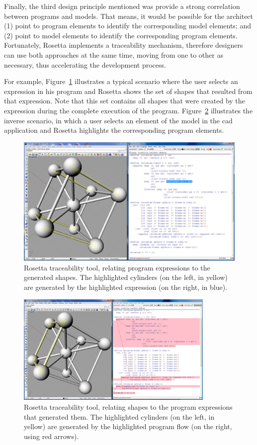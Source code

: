 Finally, the third design principle mentioned was provide a strong correlation between programs and models. That means, it would be possible for the architect (1) point to program elements to identify the corresponding model elements; and (2) point to model elements to identify the corresponding program elements. Fortunately, Rosetta implements a traceability mechanism, therefore designers can use both approaches at the same time, moving from one to other as necessary, thus accelerating the development process.

For example, Figure~\ref{fig:program-shape} illustrates a typical scenario where the user selects an expression in his program and
Rosetta shows the set of shapes that resulted from that expression. Note that this set contains all shapes that were created by the expression during the complete execution of the program. Figure~\ref{fig:shape-program} illustrates the inverse scenario, in which a user selects an element of the model in the \gls{cad} application and Rosetta highlights the corresponding program elements.

\begin{figure}[h]
  \centering
  \includegraphics[width=.85\textwidth]{images/program-to-shape}
    \caption{Rosetta traceability tool, relating program expressions to the generated shapes. The highlighted cylinders (on the left, in yellow) are generated by the highlighted expression (on the right, in blue).}
  \label{fig:program-shape}
\end{figure}

\begin{figure}[!htbp]
  \centering
  \includegraphics[width=0.85\textwidth]{images/shape-to-program}
    \caption{Rosetta traceability tool, relating shapes to the program expressions that generated them. The highlighted cylinders (on the left, in yellow) are generated by the highlighted program flow (on the right, using red arrows).}
  \label{fig:shape-program}
\end{figure}

